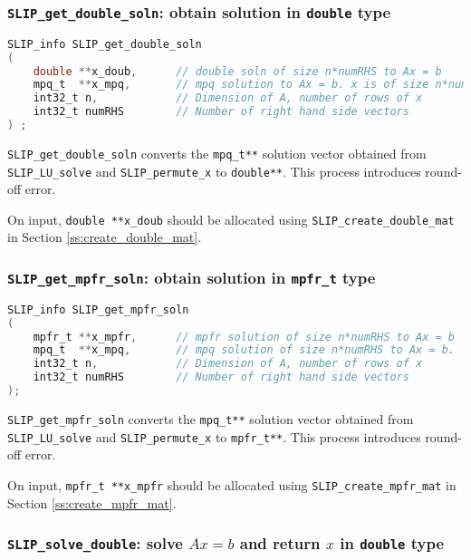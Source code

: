 \documentclass[11pt]{article}
\theoremstyle{definition}
\begin{document}
\cprotect\subsubsection{\verb|SLIP_get_double_soln|: obtain solution in \verb|double| type}\label{ss:get_double_soln}

\begin{lstlisting}[language=C,frame=single]
SLIP_info SLIP_get_double_soln
(
    double **x_doub,      // double soln of size n*numRHS to Ax = b
    mpq_t  **x_mpq,       // mpq solution to Ax = b. x is of size n*numRHS
    int32_t n,            // Dimension of A, number of rows of x
    int32_t numRHS        // Number of right hand side vectors
) ;
\end{lstlisting}

\verb|SLIP_get_double_soln| converts the \verb|mpq_t**| solution vector obtained from
 \verb|SLIP_LU_solve| and \verb|SLIP_permute_x| to \verb|double**|. This process introduces round-off error.

On input, \verb|double **x_doub| should be allocated using \verb|SLIP_create_double_mat| in Section \ref{ss:create_double_mat}.

\cprotect\subsubsection{\verb|SLIP_get_mpfr_soln|: obtain solution in \verb|mpfr_t| type}\label{ss:get_mpfr_soln}

\begin{lstlisting}[language=C,frame=single]
SLIP_info SLIP_get_mpfr_soln
(
    mpfr_t **x_mpfr,      // mpfr solution of size n*numRHS to Ax = b
    mpq_t  **x_mpq,       // mpq solution of size n*numRHS to Ax = b.
    int32_t n,            // Dimension of A, number of rows of x
    int32_t numRHS        // Number of right hand side vectors
);
\end{lstlisting}

\verb|SLIP_get_mpfr_soln| converts the \verb|mpq_t**| solution vector obtained from
 \verb|SLIP_LU_solve| and \verb|SLIP_permute_x| to \verb|mpfr_t**|. This process introduces round-off error.

On input, \verb|mpfr_t **x_mpfr| should be allocated using \verb|SLIP_create_mpfr_mat| in Section \ref{ss:create_mpfr_mat}.


\cprotect\subsubsection{\verb|SLIP_solve_double|: solve $Ax=b$ and return $x$ in \verb|double| type}\label{ss:SLIP_solve_double}
\end{document}
